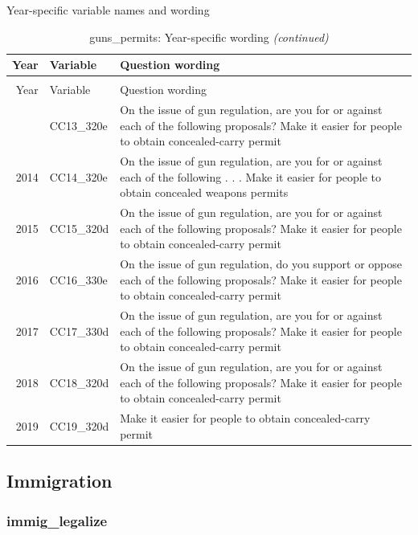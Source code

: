 \documentclass[12pt]{article}
\begin{document}
Year-specific variable names and wording

\begin{longtable}[t]{rl>{\raggedright\arraybackslash}p{10cm}}
\caption{\label{tab:unnamed-chunk-4}guns\_permits: Year-specific wording}\\
\toprule
Year & Variable & Question wording\\
\midrule
\endfirsthead
\caption[]{guns\_permits: Year-specific wording \textit{(continued)}}\\
\toprule
Year & Variable & Question wording\\
\midrule
\endhead
\
\endfoot
\bottomrule
\endlastfoot
2013 & CC13\_320e & On the issue of gun regulation, are you for or against each of the following proposals? Make it easier for people to obtain concealed-carry permit\\
2014 & CC14\_320e & On the issue of gun regulation, are you for or against each of the following . . . Make it easier for people to obtain concealed weapons permits\\
2015 & CC15\_320d & On the issue of gun regulation, are you for or against each of the following proposals? Make it easier for people to obtain concealed-carry permit\\
2016 & CC16\_330e & On the issue of gun regulation, do you support or oppose each of the following proposals? Make it easier for people to obtain concealed-carry permit\\
2017 & CC17\_330d & On the issue of gun regulation, are you for or against each of the following proposals? Make it easier for people to obtain concealed-carry permit\\
2018 & CC18\_320d & On the issue of gun regulation, are you for or against each of the following proposals? Make it easier for people to obtain concealed-carry permit\\
2019 & CC19\_320d & Make it easier for people to obtain concealed-carry permit\\*
\end{longtable}\newpage

\subsection{Immigration}\label{immigration}

\subsubsection{immig\_legalize}\label{immig_legalize}
\end{document}
